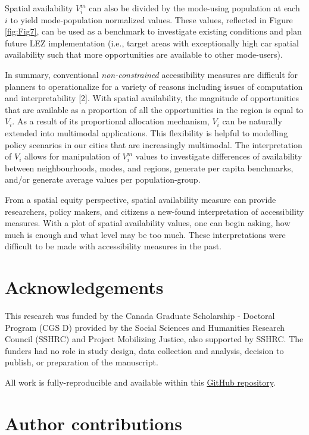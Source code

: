 \documentclass[10pt,letterpaper]{article}
\begin{document}
Spatial availability \(V_i^m\) can also be divided by the mode-using
population at each \(i\) to yield mode-population normalized values.
These values, reflected in Figure \ref{fig:Fig7}, can be used as a
benchmark to investigate existing conditions and plan future LEZ
implementation (i.e., target areas with exceptionally high car spatial
availability such that more opportunities are available to other
mode-users).

In summary, conventional \emph{non-constrained} accessibility measures
are difficult for planners to operationalize for a variety of reasons
including issues of computation and interpretability {[}2{]}. With
spatial availability, the magnitude of opportunities that are available
as a proportion of all the opportunities in the region is equal to
\(V_i\). As a result of its proportional allocation mechanism, \(V_i\)
can be naturally extended into multimodal applications. This flexibility
is helpful to modelling policy scenarios in our cities that are
increasingly multimodal. The interpretation of \(V_i\) allows for
manipulation of \(V_i^m\) values to investigate differences of
availability between neighbourhoods, modes, and regions, generate per
capita benchmarks, and/or generate average values per population-group.

From a spatial equity perspective, spatial availability measure can
provide researchers, policy makers, and citizens a new-found
interpretation of accessibility measures. With a plot of spatial
availability values, one can begin asking, how much is enough and what
level may be too much. These interpretations were difficult to be made
with accessibility measures in the past.

\hypertarget{acknowledgements}{%
\section{Acknowledgements}\label{acknowledgements}}

This research was funded by the Canada Graduate Scholarship - Doctoral
Program (CGS D) provided by the Social Sciences and Humanities Research
Council (SSHRC) and Project Mobilizing Justice, also supported by SSHRC.
The funders had no role in study design, data collection and analysis,
decision to publish, or preparation of the manuscript.

All work is fully-reproducible and available within this
\href{https://github.com/soukhova/Multimodal-spatial-availability}{GitHub
repository}.

\hypertarget{author-contributions}{%
\section{Author contributions}\label{author-contributions}}
\end{document}

